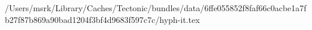 /Users/msrk/Library/Caches/Tectonic/bundles/data/6ffe055852f8faf66c0acbe1a7fb27f87b869a90bad1204f3bf4d9683f597c7c/hyph-it.tex